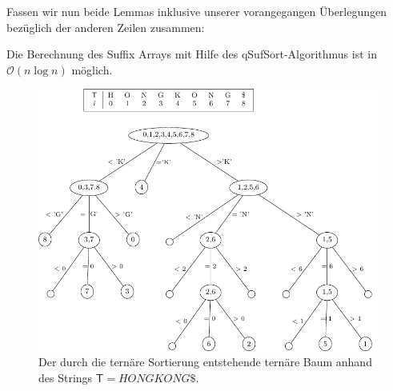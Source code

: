 Fassen wir nun beide Lemmas inklusive unserer vorangegangen Überlegungen bezüglich der anderen Zeilen zusammen: 
\begin{lemma}
Die Berechnung des Suffix Arrays mit Hilfe des qSufSort-Algorithmus ist in $\mathcal{O}(n\log n)$ möglich.
\end{lemma}
\begin{figure}[t]
\centering
\includegraphics[scale=0.9]{kapitel/saca_algorithmen/qsufsort/Bilder/TerTree.pdf}
\caption{Der durch die ternäre Sortierung entstehende ternäre Baum anhand des Strings $\mathsf{T}=HONGKONG\$$.}
\label{terTree}
\end{figure}
